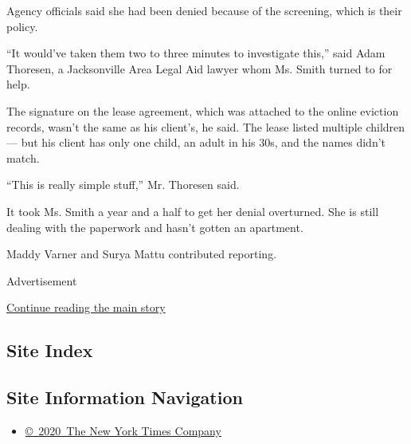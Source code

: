 Agency officials said she had been denied because of the screening,
which is their policy.

``It would've taken them two to three minutes to investigate this,''
said Adam Thoresen, a Jacksonville Area Legal Aid lawyer whom Ms. Smith
turned to for help.

The signature on the lease agreement, which was attached to the online
eviction records, wasn't the same as his client's, he said. The lease
listed multiple children --- but his client has only one child, an adult
in his 30s, and the names didn't match.

``This is really simple stuff,'' Mr. Thoresen said.

It took Ms. Smith a year and a half to get her denial overturned. She is
still dealing with the paperwork and hasn't gotten an apartment.

Maddy Varner and Surya Mattu contributed reporting.

Advertisement

\protect\hyperlink{after-bottom}{Continue reading the main story}

\hypertarget{site-index}{%
\subsection{Site Index}\label{site-index}}

\hypertarget{site-information-navigation}{%
\subsection{Site Information
Navigation}\label{site-information-navigation}}

\begin{itemize}
\tightlist
\item
  \href{https://help.nytimes.com/hc/en-us/articles/115014792127-Copyright-notice}{©~2020~The
  New York Times Company}
\end{itemize}

